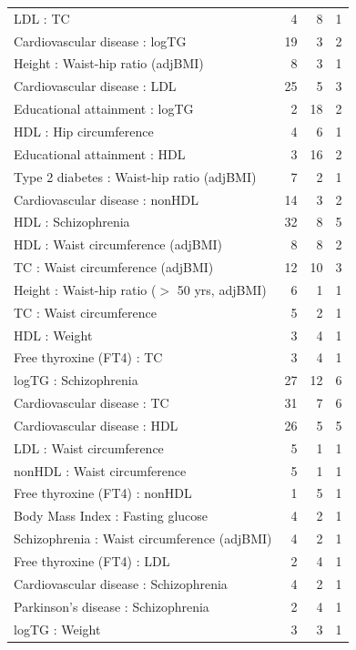 \begin{table}[ht]
\begin{tabular}{lrrr}
  LDL : TC &   4 &   8 &   1 \\ 
  Cardiovascular disease : logTG &  19 &   3 &   2 \\ 
  Height  : Waist-hip ratio (adjBMI) &   8 &   3 &   1 \\ 
  Cardiovascular disease : LDL &  25 &   5 &   3 \\ 
  Educational attainment : logTG &   2 &  18 &   2 \\ 
  HDL : Hip circumference  &   4 &   6 &   1 \\ 
  Educational attainment : HDL &   3 &  16 &   2 \\ 
  Type 2 diabetes : Waist-hip ratio (adjBMI) &   7 &   2 &   1 \\ 
  Cardiovascular disease : nonHDL &  14 &   3 &   2 \\ 
  HDL : Schizophrenia &  32 &   8 &   5 \\ 
  HDL : Waist circumference (adjBMI) &   8 &   8 &   2 \\ 
  TC : Waist circumference (adjBMI) &  12 &  10 &   3 \\ 
  Height  : Waist-hip ratio ($>$ 50 yrs, adjBMI) &   6 &   1 &   1 \\ 
  TC : Waist circumference  &   5 &   2 &   1 \\ 
  HDL : Weight  &   3 &   4 &   1 \\ 
  Free thyroxine (FT4) : TC &   3 &   4 &   1 \\ 
  logTG : Schizophrenia &  27 &  12 &   6 \\ 
  Cardiovascular disease : TC &  31 &   7 &   6 \\ 
  Cardiovascular disease : HDL &  26 &   5 &   5 \\ 
  LDL : Waist circumference  &   5 &   1 &   1 \\ 
  nonHDL : Waist circumference  &   5 &   1 &   1 \\ 
  Free thyroxine (FT4) : nonHDL &   1 &   5 &   1 \\ 
  Body Mass Index  : Fasting glucose &   4 &   2 &   1 \\ 
  Schizophrenia : Waist circumference (adjBMI) &   4 &   2 &   1 \\ 
  Free thyroxine (FT4) : LDL &   2 &   4 &   1 \\ 
  Cardiovascular disease : Schizophrenia &   4 &   2 &   1 \\ 
  Parkinson's disease : Schizophrenia &   2 &   4 &   1 \\ 
  logTG : Weight  &   3 &   3 &   1 \\ 

\end{tabular}
\end{table}
